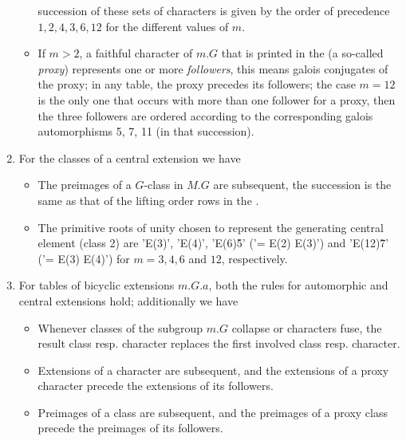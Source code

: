 \begin{enumerate}
\begin{itemize}
      succession  of these sets  of characters  is given  by the order of
      precedence  $1, 2, 4, 3, 6, 12$  for the  different values of  $m$.
\item If $m > 2$,  a faithful character of  $m.G$  that is printed in the
      {\ATLAS}  (a so-called  \mbox{\em proxy})  represents  one or  more
      \mbox{\em followers},  this means  galois conjugates  of the proxy;
      in any {\GAP} table,  the proxy  precedes  its followers;  the case
      $m = 12$  is the only one  that occurs  with more than one follower
      for a proxy,  then the three followers are ordered according to the
      corresponding galois automorphisms 5, 7, 11 (in that succession).
\end{itemize}
\item For the classes of a central extension we have\:
\begin{itemize}
\item The  preimages   of  a  $G$-class  in  $M.G$  are  subsequent,  the
      succession  is the same  as that  of the lifting order rows  in the
      \ATLAS.
\item The primitive roots  of unity  chosen  to represent  the generating
      central element (class 2) are  'E(3)',  'E(4)',  'E(6)\^5' ('= E(2)
      \* E(3)') and  'E(12)\^7'  ('= E(3) \* E(4)') for $m = 3, 4, 6$ and
      $12$, respectively.
\end{itemize}
\item For  tables  of bicyclic extensions  $m.G.a$,  both  the rules  for
      automorphic and central extensions hold; additionally we have\:
\begin{itemize}
\item Whenever classes of the subgroup $m.G$ collapse or characters fuse,
      the result class resp. character  replaces the first involved class
      resp.  character. 
\item Extensions  of a character are subsequent,  and the extensions of a
      proxy character precede the extensions of its followers.
\item Preimages  of a class are subsequent,  and the preimages of a proxy
      class precede the preimages of its followers.
\end{itemize}
\end{enumerate}

\newpage
{}

